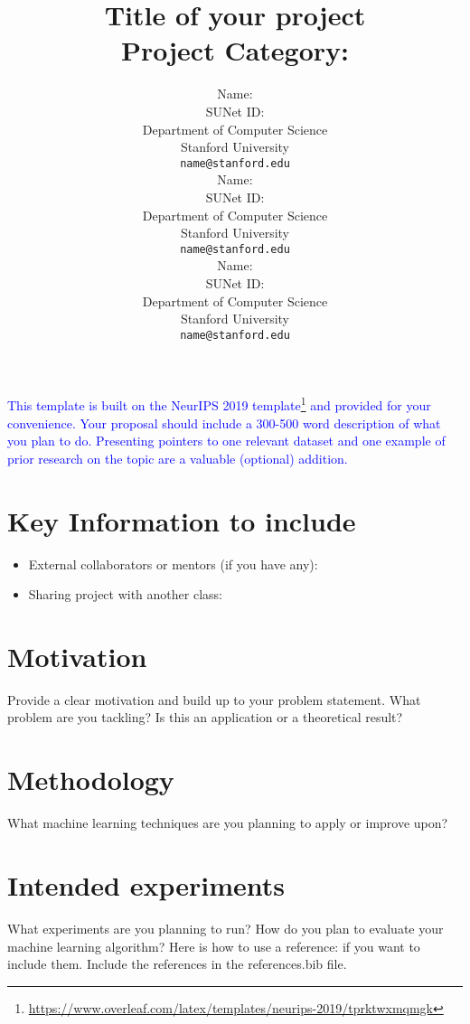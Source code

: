 \documentclass{article}
\title{
  Title of your project \\
  \vspace{1em}
  \small{Project Category:} \\
}
\author{
  Name: \\
  SUNet ID: \\
  Department of Computer Science \\
  Stanford University \\
  \texttt{name@stanford.edu} \\
  \And
  Name: \\
  SUNet ID: \\
  Department of Computer Science \\
  Stanford University \\
  \texttt{name@stanford.edu} \\
  \And
  Name: \\
  SUNet ID: \\
  Department of Computer Science \\
  Stanford University \\
  \texttt{name@stanford.edu}
}
\newcommand{\note}[1]{\textcolor{blue}{{#1}}}
\begin{document}
\maketitle



\note{This template is built on the NeurIPS 2019 template\footnote{\url{https://www.overleaf.com/latex/templates/neurips-2019/tprktwxmqmgk}} and provided for your convenience. Your proposal should include a 300-500 word description of what you plan to do. Presenting pointers to one relevant dataset and one example of prior research on the topic are a valuable (optional) addition.}

\section{Key Information to include}

\begin{itemize}
    \item External collaborators or mentors (if you have any):
    \item Sharing project with another class:
\end{itemize}

\section{Motivation}
Provide a clear motivation and build up to your problem statement. What problem are you tackling? Is this an application or a theoretical result?

\section{Methodology}
What machine learning techniques are you planning to apply or improve upon?

\section{Intended experiments}
What experiments are you planning to run? How do you plan to evaluate your machine learning algorithm? Here is how to use a reference: \cite{attention_vaswani_17} if you want to include them. Include the references in the references.bib file.



\end{document}
